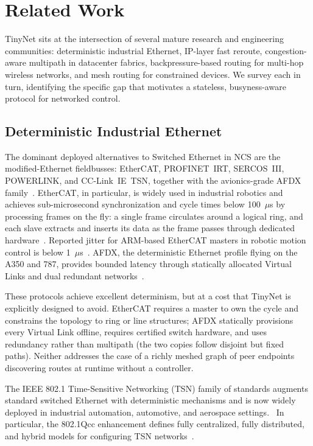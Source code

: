 \section{Related Work}
\label{sec:related}
 
TinyNet sits at the intersection of several mature research and engineering communities: deterministic industrial Ethernet, IP-layer fast reroute, congestion-aware multipath in datacenter fabrics, backpressure-based routing for multi-hop wireless networks, and mesh routing for constrained devices. We survey each in turn, identifying the specific gap that motivates a stateless, busyness-aware protocol for networked control.
 
\subsection{Deterministic Industrial Ethernet}
\label{sec:related:industrial}
 
The dominant deployed alternatives to Switched Ethernet in NCS are the modified-Ethernet fieldbusses: EtherCAT, PROFINET~IRT, SERCOS~III, POWERLINK, and CC-Link~IE~TSN, together with the avionics-grade AFDX family~\cite{felser2005realtime,zunino2018industrial}. EtherCAT, in particular, is widely used in industrial robotics and achieves sub-microsecond synchronization and cycle times below 100~$\mu$s by processing frames on the fly: a single frame circulates around a logical ring, and each slave extracts and inserts its data as the frame passes through dedicated hardware~\cite{ethercat_ig,prytz2008performance}. Reported jitter for ARM-based EtherCAT masters in robotic motion control is below 1~$\mu$s~\cite{ethercat_arm_robot}. AFDX, the deterministic Ethernet profile flying on the A350 and 787, provides bounded latency through statically allocated Virtual Links and dual redundant networks~\cite{afdx_nasa}.
 
These protocols achieve excellent determinism, but at a cost that TinyNet is explicitly designed to avoid. EtherCAT requires a master to own the cycle and constrains the topology to ring or line structures; AFDX statically provisions every Virtual Link offline, requires certified switch hardware, and uses redundancy rather than multipath (the two copies follow disjoint but fixed paths). Neither addresses the case of a richly meshed graph of peer endpoints discovering routes at runtime without a controller.
 
The IEEE 802.1 Time-Sensitive Networking (TSN) family of standards augments standard switched Ethernet with deterministic mechanisms and is now widely deployed in industrial automation, automotive, and aerospace settings.~\cite{tsn_survey_arxiv,tsn_ieee_tg} In particular, the 802.1Qcc enhancement defines fully centralized, fully distributed, and hybrid models for configuring TSN networks~\cite{nasrallah_qcc_arxiv}.
 
